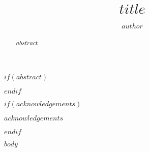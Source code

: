 \documentclass[12pt,english]{kuthesis}
\title{$title$}
\author{$author$}
\begin{document}
\begin{romanpages}

\maketitle
$if(abstract)$
  \begin{abstract}
    $abstract$
  \end{abstract}
$endif$

$if(acknowledgements)$
  \begin{acknowledgementslong}
    $acknowledgements$
  \end{acknowledgementslong}
$endif$
\tableofcontents{}

\listoffigures

\listoftables

\end{romanpages}

$body$
\end{document}
